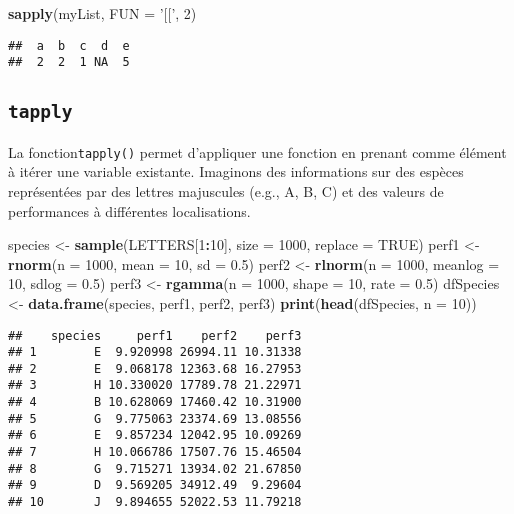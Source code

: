 \documentclass[]{book}
\newenvironment{Shaded}{\begin{snugshade}}{\end{snugshade}}
\newcommand{\KeywordTok}[1]{\textcolor[rgb]{0.13,0.29,0.53}{\textbf{#1}}}
\newcommand{\DataTypeTok}[1]{\textcolor[rgb]{0.13,0.29,0.53}{#1}}
\newcommand{\DecValTok}[1]{\textcolor[rgb]{0.00,0.00,0.81}{#1}}
\newcommand{\FloatTok}[1]{\textcolor[rgb]{0.00,0.00,0.81}{#1}}
\newcommand{\StringTok}[1]{\textcolor[rgb]{0.31,0.60,0.02}{#1}}
\newcommand{\OtherTok}[1]{\textcolor[rgb]{0.56,0.35,0.01}{#1}}
\newcommand{\OperatorTok}[1]{\textcolor[rgb]{0.81,0.36,0.00}{\textbf{#1}}}
\newcommand{\NormalTok}[1]{#1}
\theoremstyle{definition}
\theoremstyle{definition}
\theoremstyle{definition}
\theoremstyle{remark}
\begin{document}
\begin{Shaded}
\begin{Highlighting}[]
\KeywordTok{sapply}\NormalTok{(myList, }\DataTypeTok{FUN =} \StringTok{'[['}\NormalTok{, }\DecValTok{2}\NormalTok{)}
\end{Highlighting}
\end{Shaded}

\begin{verbatim}
##  a  b  c  d  e 
##  2  2  1 NA  5
\end{verbatim}

\subsection{\texorpdfstring{\texttt{tapply}}{tapply}}\label{l17tapply}

La fonction\texttt{tapply()} permet d'appliquer une fonction en prenant
comme élément à itérer une variable existante. Imaginons des
informations sur des espèces représentées par des lettres majuscules
(e.g., A, B, C) et des valeurs de performances à différentes
localisations.

\begin{Shaded}
\begin{Highlighting}[]
\NormalTok{species <-}\StringTok{ }\KeywordTok{sample}\NormalTok{(LETTERS[}\DecValTok{1}\OperatorTok{:}\DecValTok{10}\NormalTok{], }\DataTypeTok{size =} \DecValTok{1000}\NormalTok{, }\DataTypeTok{replace =} \OtherTok{TRUE}\NormalTok{)}
\NormalTok{perf1 <-}\StringTok{ }\KeywordTok{rnorm}\NormalTok{(}\DataTypeTok{n =} \DecValTok{1000}\NormalTok{, }\DataTypeTok{mean =} \DecValTok{10}\NormalTok{, }\DataTypeTok{sd =} \FloatTok{0.5}\NormalTok{)}
\NormalTok{perf2 <-}\StringTok{ }\KeywordTok{rlnorm}\NormalTok{(}\DataTypeTok{n =} \DecValTok{1000}\NormalTok{, }\DataTypeTok{meanlog =} \DecValTok{10}\NormalTok{, }\DataTypeTok{sdlog =} \FloatTok{0.5}\NormalTok{)}
\NormalTok{perf3 <-}\StringTok{ }\KeywordTok{rgamma}\NormalTok{(}\DataTypeTok{n =} \DecValTok{1000}\NormalTok{, }\DataTypeTok{shape =} \DecValTok{10}\NormalTok{, }\DataTypeTok{rate =} \FloatTok{0.5}\NormalTok{)}
\NormalTok{dfSpecies <-}\StringTok{ }\KeywordTok{data.frame}\NormalTok{(species, perf1, perf2, perf3)}
\KeywordTok{print}\NormalTok{(}\KeywordTok{head}\NormalTok{(dfSpecies, }\DataTypeTok{n =} \DecValTok{10}\NormalTok{))}
\end{Highlighting}
\end{Shaded}

\begin{verbatim}
##    species     perf1    perf2    perf3
## 1        E  9.920998 26994.11 10.31338
## 2        E  9.068178 12363.68 16.27953
## 3        H 10.330020 17789.78 21.22971
## 4        B 10.628069 17460.42 10.31900
## 5        G  9.775063 23374.69 13.08556
## 6        E  9.857234 12042.95 10.09269
## 7        H 10.066786 17507.76 15.46504
## 8        G  9.715271 13934.02 21.67850
## 9        D  9.569205 34912.49  9.29604
## 10       J  9.894655 52022.53 11.79218
\end{verbatim}
\end{document}
